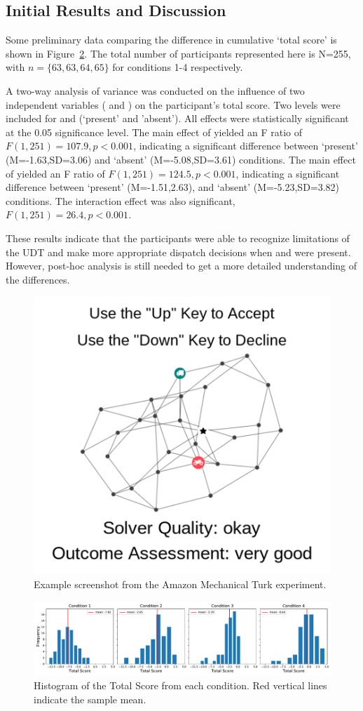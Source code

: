 \subsection{Initial Results and Discussion}
Some preliminary data comparing the difference in cumulative `total score' is shown in Figure~\ref{fig:total_score}. The total number of participants represented here is N=255, with $n=\{63,63,64,65\}$ for conditions 1-4 respectively. 

A two-way analysis of variance was conducted on the influence of two independent variables (\xQ{} and \xO) on the participant's total score. Two levels were included for \xQ{} and \xO{} (`present' and 'absent'). All effects were statistically significant at the 0.05 significance level. The main effect of \xQ{} yielded an F ratio of $F(1,251)=107.9,p<0.001$, indicating a significant difference between \xQ `present' (M=-1.63,SD=3.06) and `absent' (M=-5.08,SD=3.61) conditions. The main effect of \xO{} yielded an F ratio of $F(1,251)=124.5,p<0.001$, indicating a significant difference between \xO{} `present' (M=-1.51,2.63), and `absent' (M=-5.23,SD=3.82) conditions. The interaction effect was also significant, $F(1,251)=26.4,p<0.001$.

These results indicate that the participants were able to recognize limitations of the UDT and make more appropriate dispatch decisions when \xQ{} and \xO{} were present. However, post-hoc analysis is still needed to get a more detailed understanding of the differences.

\begin{figure}[tbp]
    \centering
    \includegraphics[width=0.45\linewidth]{Figures/experiment_screenshot_Compressed.png}
    \caption{Example screenshot from the Amazon Mechanical Turk experiment.} 
    \label{fig:experiment_screenshot}
\end{figure}

\begin{figure}[tbp]
    \centering
    \includegraphics[width=1.0\linewidth]{Figures/total_score.pdf}
    \caption{Histogram of the Total Score from each condition. Red vertical lines indicate the sample mean.}
    \label{fig:total_score}
\end{figure}

